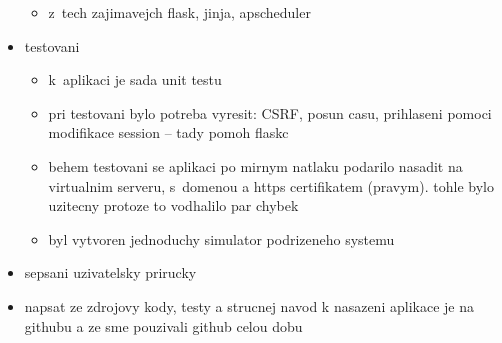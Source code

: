 \begin{itemize}
\begin{itemize}
        \item z~tech zajimavejch flask, jinja, apscheduler
    \end{itemize}
    \item testovani
    \begin{itemize}
        \item k~aplikaci je sada unit testu
        \item pri testovani bylo potreba vyresit: CSRF, posun casu, prihlaseni pomoci modifikace session -- tady pomoh flaskc
        \item behem testovani se aplikaci po mirnym natlaku podarilo nasadit na virtualnim serveru, s~domenou a https certifikatem (pravym). tohle bylo uzitecny protoze to vodhalilo par chybek
        \item byl vytvoren jednoduchy simulator podrizeneho systemu
    \end{itemize}
    \item sepsani uzivatelsky prirucky
    \item napsat ze zdrojovy kody, testy a strucnej navod k nasazeni aplikace je na githubu a ze sme pouzivali github celou dobu
\end{itemize}